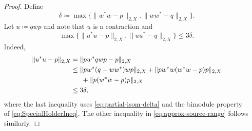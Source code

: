 \documentclass[a4paper,11pt]{amsart}
\theoremstyle{definition}
\numberwithin{equation}{section}
\numberwithin{theorem}{section}
\begin{document}
\begin{proof}
	Define
	\begin{equation}\label{eq:partial-isom-delta}
		\delta \coloneqq \max \big\{\|w^*w - p\|_{2, X}, \|ww^* - q\|_{2, X} \big\}.
	\end{equation}
	Let $u \coloneqq q w p$ and note that $u$ is a contraction and 
	\begin{equation}\label{eq:approx-source-range}
		\max \big\{\|u^*u - p\|_{2, X}, \|uu^* - q\|_{2, X} \big\} \leq 3 \delta.
	\end{equation}
	Indeed,
	\begin{equation}\begin{split}
		\|u^*u - p\|_{2, X} &= \|pw^*qwp - p\|_{2, X} \\
		&\leq \|pw^*(q - ww^*)w p\|_{2, X} + \| pw^*w(w^*w - p)p\|_{2, X}  \\ &\hphantom{==} + \|p (w^*w - p)p\|_{2, X}  \\ &\leq 3\delta, \label{eq:approx-source-range-2}
	\end{split}\end{equation}
	where the last inequality uses \eqref{eq:partial-isom-delta} and the bimodule property of \eqref{eq:SpecialHolderIneq}.  The other inequality in \eqref{eq:approx-source-range} follows similarly.
	

\end{proof}
\end{document}
